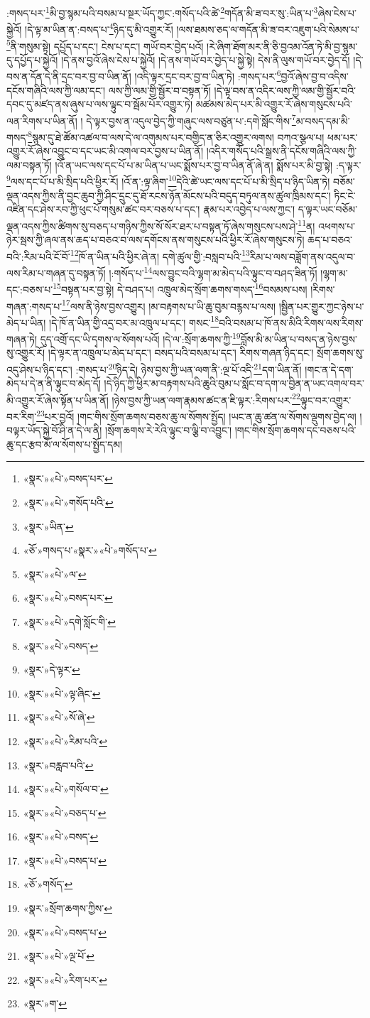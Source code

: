 :གསད་པར་\footnote{«སྣར་»«པེ་»བསད་པར་}མི་བྱ་སྙམ་པའི་བསམ་པ་སྔར་ཡོད་ཀྱང་:གསོད་པའི་ཚེ་\footnote{«སྣར་»«པེ་»གསོད་པའི་}གདོན་མི་ཟ་བར་སུ་:ཡིན་པ་\footnote{«སྣར་»ཡིན་}ཞེས་ངེས་པ་སྐྱེའོ། །དེ་ལྟ་མ་ཡིན་ན་:བསད་པ་\footnote{«ཅོ་»གསད་པ་«སྣར་»«པེ་»གསོད་པ་}ཉིད་དུ་མི་འགྱུར་རོ། །ལས་ཐམས་ཅད་ལ་གདོན་མི་ཟ་བར་འཇུག་པའི་སེམས་པ་\footnote{«སྣར་»«པེ་»ལ་}ནི་གསུམ་སྟེ། དཔྱོད་པ་དང་། ངེས་པ་དང་། གཡོ་བར་བྱེད་པའོ། །རེ་ཞིག་ཐོག་མར་ནི་ཅི་བྱའམ་འོན་ཏེ་མི་བྱ་སྙམ་དུ་དཔྱོད་པ་སྐྱེའོ། །དེ་ནས་བྱའོ་ཞེས་ངེས་པ་སྐྱེའོ། །དེ་ནས་གཡོ་བར་བྱེད་པ་སྐྱེ་སྟེ། དེས་ནི་ལུས་གཡོ་བར་བྱེད་དོ། །དེ་བས་ན་དོན་དེ་ནི་དྲང་བར་བྱ་བ་ཡིན་ནོ། །འདི་ལྟར་དྲང་བར་བྱ་བ་ཡིན་ཏེ། :གསད་པར་\footnote{«སྣར་»«པེ་»བསད་པར་}བྱའོ་ཞེས་བྱ་བ་འདིས་དངོས་གཞིའི་ལས་ཀྱི་ལམ་དང་། ལས་ཀྱི་ལམ་གྱི་སྦྱོར་བ་བསྟན་ཏོ། །དེ་ལྟ་བས་ན་འདིར་ལས་ཀྱི་ལམ་གྱི་སྦྱོར་བའི་དབང་དུ་མཛད་ནས་ཞུས་པ་ལས་ལྟུང་བ་སྦོམ་པོར་འགྱུར་ཏེ། མཚམས་མེད་པར་མི་འགྱུར་རོ་ཞེས་གསུངས་པའི་ལན་རིགས་པ་ཡིན་ནོ། །
དེ་ལྟར་བྱས་ན་འདུལ་བྱེད་ཀྱི་གཞུང་ལས་བཙུན་པ་:དགེ་སློང་གིས་\footnote{«སྣར་»«པེ་»དགེ་སློང་གི་}མ་བསད་དམ་མི་གསད་\footnote{«སྣར་»«པེ་»བསད་}སྙམ་དུ་ཐེ་ཚོམ་འཚལ་བ་ལས་དེ་ལ་འགུམས་པར་བགྱིད་ན་ཅིར་འགྱུར་ལགས། བཀའ་སྩལ་པ། ཕམ་པར་འགྱུར་རོ་ཞེས་འབྱུང་བ་དང་ཡང་མི་འགལ་བར་བྱས་པ་ཡིན་ནོ། །འདིར་གསོད་པའི་སྒྲས་ནི་དངོས་གཞིའི་ལས་ཀྱི་ལམ་བསྟན་ཏོ། །འོ་ན་ཡང་ལས་དང་པོ་པ་མ་ཡིན་པ་ཡང་སྨོས་པར་བྱ་བ་ཡིན་ནོ་ཞེ་ན། སྨོས་པར་མི་བྱ་སྟེ། :ད་ལྟར་\footnote{«སྣར་»དེ་ལྟར་}ལས་དང་པོ་པ་མི་སྲིད་པའི་ཕྱིར་རོ། །འོ་ན་:ལྟ་ཞིག་\footnote{«སྣར་»«པེ་»ལྟ་ཞིང་}དེའི་ཚེ་ཡང་ལས་དང་པོ་པ་མི་སྲིད་པ་ཉིད་ཡིན་ཏེ། བཅོམ་ལྡན་འདས་ཀྱིས་ནི་བྱང་ཆུབ་ཀྱི་ཤིང་དྲུང་དུ་ཐོ་རངས་ཉོན་མོངས་པའི་བདུད་བཏུལ་ནས་ཚུལ་ཁྲིམས་དང་། ཏིང་ངེ་འཛིན་དང་ཤེས་རབ་ཀྱི་ཕུང་པོ་གསུམ་ཚང་བར་བཅས་པ་དང་། རྣམ་པར་འབྱེད་པ་ལས་ཀྱང་། ད་ལྟར་ཡང་བཅོམ་ལྡན་འདས་ཀྱིས་ཚིགས་སུ་བཅད་པ་གཉིས་ཀྱིས་སོ་སོར་ཐར་པ་བསྟན་ཏོ་ཞེས་གསུངས་པས་ཤེ་\footnote{«སྣར་»«པེ་»སོ་ཞེ་}ན། འཕགས་པ་ཉེར་སྦས་ཀྱི་ཞལ་ནས་ཆད་པ་བཅའ་བ་ལས་དགོངས་ནས་གསུངས་པའི་ཕྱིར་རོ་ཞེས་གསུངས་ཏེ། ཆད་པ་བཅའ་བའི་:རིམ་པའི་ངོ་བོ་\footnote{«སྣར་»«པེ་»རིམ་པའི་}ཁོ་ན་ཡིན་པའི་ཕྱིར་ཞེ་ན། དགེ་ཚུལ་གྱི་:བསླབ་པའི་\footnote{«སྣར་»བརླབ་པའི་}རིམ་པ་ལས་བཟློག་ནས་འདུལ་བ་ལས་རིམ་པ་གཞན་དུ་བསྟན་ཏོ། །:གསོད་པ་\footnote{«སྣར་»«པེ་»གསོལ་བ་}ལས་བྱུང་བའི་ལྷག་མ་མེད་པའི་ལྟུང་བ་བཤད་ཟིན་ཏོ། །ལྷག་མ་དང་:བཅས་པ་\footnote{«སྣར་»«པེ་»བཅད་པ་}བསྟན་པར་བྱ་སྟེ། དེ་བཤད་པ། འཁྲུལ་མེད་སྲོག་ཆགས་གསད་\footnote{«སྣར་»«པེ་»བསད་}བསམས་པས། །རིགས་གཞན་:གསད་པ་\footnote{«སྣར་»«པེ་»བསད་པ་}ལས་ནི་ཉེས་བྱས་འགྱུར། །མ་བརྟགས་པ་ཡི་ཆུ་བུམ་བརྙས་པ་ལས། །སྦྱིན་པར་གྱུར་ཀྱང་ཉེས་པ་མེད་པ་ཡིན། །དེ་ཁོ་ན་ཡིན་གྱི་འདྲ་བར་མ་འཁྲུལ་པ་དང་། གསང་\footnote{«ཅོ་»གསོད་}བའི་བསམ་པ་ཁོ་ནས་མིའི་རིགས་ལས་རིགས་གཞན་ཏེ། དུད་འགྲོ་དང་ཡི་དྭགས་ལ་སོགས་པའོ། །དེ་ལ་:སྲོག་ཆགས་ཀྱི་\footnote{«སྣར་»སྲོག་ཆགས་ཀྱིས་}བློས་མི་མ་ཡིན་པ་བསད་ན་ཉེས་བྱས་སུ་འགྱུར་རོ། །དེ་ལྟར་ན་འཁྲུལ་པ་མེད་པ་དང་། བསད་པའི་བསམ་པ་དང་། རིགས་གཞན་ཉིད་དང་། སྲོག་ཆགས་སུ་འདུ་ཤེས་པ་ཉིད་དང་། :གསད་པ་\footnote{«སྣར་»«པེ་»བསད་པ་}ཉིད་དེ། ཉེས་བྱས་ཀྱི་ཡན་ལག་ནི་:ལྔ་པོ་འདི་\footnote{«སྣར་»«པེ་»ལྔ་པོ་}དག་ཡིན་ནོ། །གང་ན་དེ་དག་མེད་པ་དེ་ན་ནི་ལྟུང་བ་མེད་དོ། །དེ་ཉིད་ཀྱི་ཕྱིར་མ་བརྟགས་པའི་ཆུའི་བུམ་པ་སློང་བ་དག་ལ་བྱིན་ན་ཡང་འགལ་བར་མི་འགྱུར་རོ་ཞེས་སྟོན་པ་ཡིན་ནོ། །ཉེས་བྱས་ཀྱི་ཡན་ལག་རྣམས་ཚང་ན་ཇི་ལྟར་:རིགས་པར་\footnote{«སྣར་»«པེ་»རིག་པར་}ལྟུང་བར་འགྱུར་བར་རིག་\footnote{«སྣར་»ག་}པར་བྱའོ། །གང་གིས་སྲོག་ཆགས་བཅས་ཆུ་ལ་སོགས་སྤྱོད། །ཡང་ན་ཆུ་ཚན་ལ་སོགས་ལྡུགས་བྱེད་ལ། །བལྟར་ཡོད་སྐྱེ་བོ་ཤི་ན་དེ་ལ་ནི། །སྲོག་ཆགས་རེ་རེའི་ལྟུང་བ་ལྕི་བ་འབྱུང་། །གང་གིས་སྲོག་ཆགས་དང་བཅས་པའི་ཆུ་དང་རྩབ་མོ་ལ་སོགས་པ་སྤྱོད་དམ། 